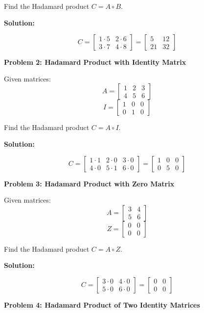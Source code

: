\documentclass[
  letterpaper,
  DIV=11,
  numbers=noendperiod]{scrreprt}
\theoremstyle{plain}
\theoremstyle{definition}
\theoremstyle{remark}
\begin{document}
Find the Hadamard product \(C=A\circ B\).

\textbf{Solution:}

\[C=\begin{bmatrix}
1\cdot5&2\cdot6\\
3\cdot7&4\cdot8
\end{bmatrix}=
\begin{bmatrix}
5&12\\
21&32
\end{bmatrix}\]

\textbf{Problem 2: Hadamard Product with Identity Matrix}

Given matrices: \[A=\begin{bmatrix}1&2&3\\4&5&6\end{bmatrix}\]
\[I=\begin{bmatrix}1&0&0\\0&1&0\end{bmatrix}\]

Find the Hadamard product \(C=A\circ I\).

\textbf{Solution:}

\[C=\begin{bmatrix}
1\cdot1&2\cdot0&3\cdot0\\
4\cdot0&5\cdot1&6\cdot0
\end{bmatrix}=
\begin{bmatrix}
1&0&0\\
0&5&0
\end{bmatrix}\]

\textbf{Problem 3: Hadamard Product with Zero Matrix}

Given matrices: \[A=\begin{bmatrix}3&4\\5&6\end{bmatrix}\]
\[Z=\begin{bmatrix}0&0\\0&0\end{bmatrix}\]

Find the Hadamard product \(C=A\circ Z\).

\textbf{Solution:}

\[C=\begin{bmatrix}
3\cdot0&4\cdot0\\
5\cdot0&6\cdot0
\end{bmatrix}=
\begin{bmatrix}
0&0\\
0&0
\end{bmatrix}\]

\textbf{Problem 4: Hadamard Product of Two Identity Matrices}
\end{document}
